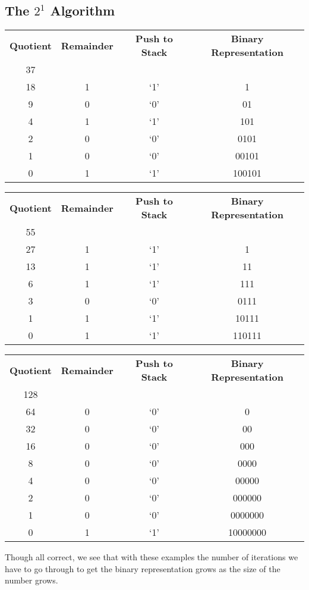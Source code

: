 \documentclass[12pt]{article}
\begin{document}
\subsection{The $2^1$ Algorithm}
\begin{center}
  \begin{tabular}{c|c|c|c}
    \textbf{Quotient} & \textbf{Remainder} & \textbf{Push to Stack} & \textbf{Binary Representation} \\
    37 &   &     & \\
    18 & 1 & `1' & 1 \\
    9  & 0 & `0' & 01 \\
    4  & 1 & `1' & 101 \\
    2  & 0 & `0' & 0101 \\
    1  & 0 & `0' & 00101 \\
    0  & 1 & `1' & 100101
  \end{tabular}
\end{center}

\begin{center}
  \begin{tabular}{c|c|c|c}
    \textbf{Quotient} & \textbf{Remainder} & \textbf{Push to Stack} & \textbf{Binary Representation} \\
    55 &   &     & \\
    27 & 1 & `1' & 1 \\
    13 & 1 & `1' & 11 \\
    6  & 1 & `1' & 111 \\
    3  & 0 & `0' & 0111 \\
    1  & 1 & `1' & 10111 \\
    0  & 1 & `1' & 110111
  \end{tabular}
\end{center}

\begin{center}
  \begin{tabular}{c|c|c|c}
    \textbf{Quotient} & \textbf{Remainder} & \textbf{Push to Stack} & \textbf{Binary Representation} \\
    128 &   &     & \\
    64  & 0 & `0' & 0 \\
    32  & 0 & `0' & 00 \\
    16  & 0 & `0' & 000 \\
    8   & 0 & `0' & 0000 \\
    4   & 0 & `0' & 00000 \\
    2   & 0 & `0' & 000000 \\
    1   & 0 & `0' & 0000000 \\
    0   & 1 & `1' & 10000000
  \end{tabular}
\end{center}
Though all correct, we see that with these examples the number of iterations we have to go through to get the binary representation grows as the size of the number grows.
\end{document}
